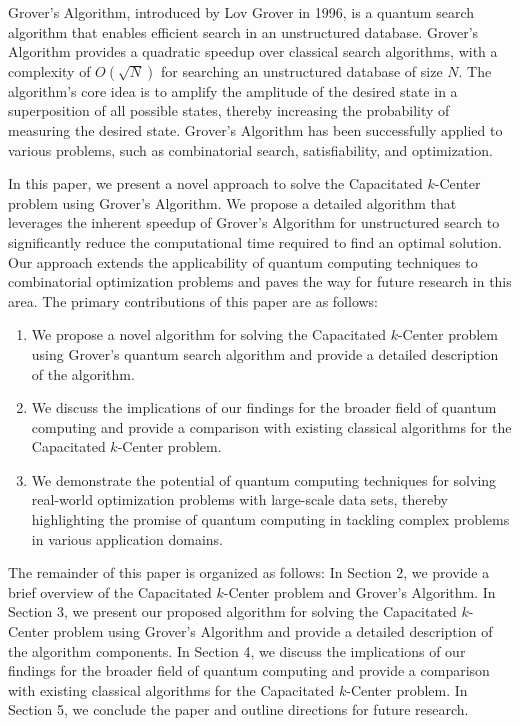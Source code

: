Grover's Algorithm, introduced by Lov Grover in 1996, is a quantum search algorithm that enables efficient search in an unstructured database. Grover's Algorithm provides a quadratic speedup over classical search algorithms, with a complexity of $O(\sqrt{N})$ for searching an unstructured database of size $N$. The algorithm's core idea is to amplify the amplitude of the desired state in a superposition of all possible states, thereby increasing the probability of measuring the desired state. Grover's Algorithm has been successfully applied to various problems, such as combinatorial search, satisfiability, and optimization.

In this paper, we present a novel approach to solve the Capacitated $k$-Center problem using Grover's Algorithm. We propose a detailed algorithm that leverages the inherent speedup of Grover's Algorithm for unstructured search to significantly reduce the computational time required to find an optimal solution. Our approach extends the applicability of quantum computing techniques to combinatorial optimization problems and paves the way for future research in this area. The primary contributions of this paper are as follows:

\begin{enumerate}
    \item We propose a novel algorithm for solving the Capacitated $k$-Center problem using Grover's quantum search algorithm and provide a detailed description of the algorithm.
    
    \item We discuss the implications of our findings for the broader field of quantum computing and provide a comparison with existing classical algorithms for the Capacitated $k$-Center problem.
    
    \item We demonstrate the potential of quantum computing techniques for solving real-world optimization problems with large-scale data sets, thereby highlighting the promise of quantum computing in tackling complex problems in various application domains.
\end{enumerate}

The remainder of this paper is organized as follows: In Section 2, we provide a brief overview of the Capacitated $k$-Center problem and Grover's Algorithm. In Section 3, we present our proposed algorithm for solving the Capacitated $k$-Center problem using Grover's Algorithm and provide a detailed description of the algorithm components. In Section 4, we discuss the implications of our findings for the broader field of quantum computing and provide a comparison with existing classical algorithms for the Capacitated $k$-Center problem. In Section 5, we conclude the paper and outline directions for future research.

